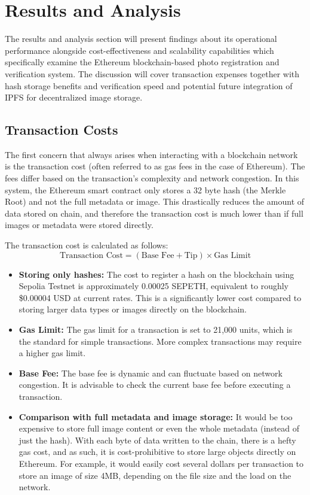 \chapter{Results and Analysis}

The results and analysis section will present findings about its operational performance alongside cost-effectiveness and scalability capabilities which specifically examine the Ethereum blockchain-based photo registration and verification system. 
The discussion will cover transaction expenses together with hash storage benefits and verification speed and potential future integration of IPFS for decentralized image storage.

\section{Transaction Costs}

The first concern that always arises when interacting with a blockchain network is the transaction cost (often referred to as gas fees in the case of Ethereum). 
The fees differ based on the transaction’s complexity and network congestion. In this system, the Ethereum smart contract only stores a 32 byte hash (the Merkle Root) and not the full metadata or image. 
This drastically reduces the amount of data stored on chain, and therefore the transaction cost is much lower than if full images or metadata were stored directly.

The transaction cost is calculated as follows:
\begin{equation}
    \text{Transaction Cost} = (\text{Base Fee} + \text{Tip}) \times \text{Gas Limit}
\end{equation}

\begin{itemize}
    \item \textbf{Storing only hashes:} The cost to register a hash on the blockchain using Sepolia Testnet is approximately 0.00025 SEPETH, equivalent to roughly \$0.00004 USD at current rates. This is a significantly lower cost compared to storing larger data types or images directly on the blockchain.
    \item \textbf{Gas Limit:} The gas limit for a transaction is set to 21,000 units, which is the standard for simple transactions. More complex transactions may require a higher gas limit.
    \item \textbf{Base Fee:} The base fee is dynamic and can fluctuate based on network congestion. It is advisable to check the current base fee before executing a transaction.
    \item \textbf{Comparison with full metadata and image storage:} It would be too expensive to store full image content or even the whole metadata (instead of just the hash). With each byte of data written to the chain, there is a hefty gas cost, and as such, it is cost-prohibitive to store large objects directly on Ethereum. For example, it would easily cost several dollars per transaction to store an image of size 4MB, depending on the file size and the load on the network.
\end{itemize}

